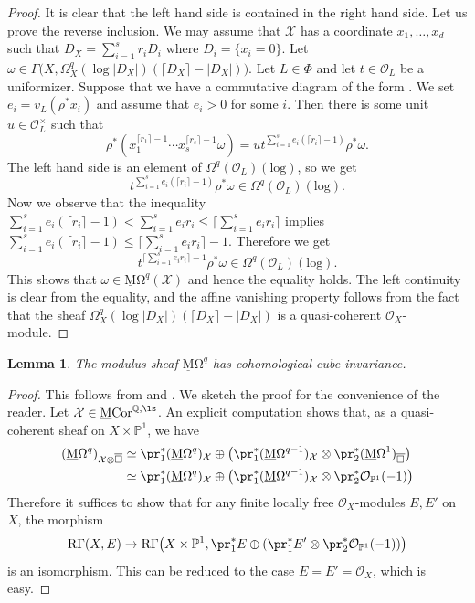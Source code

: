 \documentclass{amsart}
\theoremstyle{plain}
\newtheorem{lemma}[theorem]{Lemma}
\theoremstyle{definition}
\theoremstyle{remark}
\numberwithin{equation}{section}
\def\ceil#1{\lceil #1 \rceil}
\def\bcube{{\overline{\square}}}
\def\logrm{\mathrm{log}}
\def\RGamma{\mathrm{R}\Gamma}
\def\MCor{\mathrm{\underline{M}Cor}}
\def\MOmega{\mathrm{\underline{M}\Omega}}
\begin{document}
\begin{proof}
        It is clear that the left hand side is contained in the right hand side.
        Let us prove the reverse inclusion.
        We may assume that $\mathcal{X}$ has a coordinate $x_1,\dots,x_d$ such that $D_X=\sum_{i=1}^s r_i D_i$ where $D_i=\{x_i=0\}$.
        Let $\omega\in \Gamma\bigl(X,\Omega^q_X(\log |D_X|)(\ceil{D_X}-|D_X|)\bigr)$.
        Let $L\in \Phi$ and let $t\in \mathcal{O}_L$ be a uniformizer.
        Suppose that we have a commutative diagram of the form .
	We set $e_i=v_L(\rho^*x_i)$ and assume that $e_i>0$ for some $i$.
	Then there is some unit $u\in \mathcal{O}_L^\times$ such that
	$$
	\rho^*(x_1^{\ceil{r_1}-1}\cdots x_s^{\ceil{r_s}-1}\omega)
        = u t^{\sum_{i=1}^s e_i(\ceil{r_i}-1)}\rho^*\omega.
        $$
        The left hand side is an element of $\Omega^q(\mathcal{O}_L)(\logrm)$, so we get
        $$
            t^{\sum_{i=1}^s e_i(\ceil{r_i}-1)}\rho^*\omega \in \Omega^q(\mathcal{O}_L)(\logrm).
        $$
	Now we observe that the inequality $\sum_{i=1}^s e_i(\ceil{r_i}-1)<\sum_{i=1}^s e_i r_i\leq \ceil{\sum_{i=1}^s e_i r_i}$ implies $\sum_{i=1}^s e_i(\ceil{r_i}-1)\leq \ceil{\sum_{i=1}^s e_i r_i}-1$.
        Therefore we get
	$$
		t^{\ceil{\sum_{i=1}^s e_i r_i}-1}\rho^*\omega\in \Omega^q(\mathcal{O}_L)(\logrm).
	$$
	This shows that $\omega\in \MOmega^q(\mathcal{X})$ and hence the equality holds.
    The left continuity is clear from the equality, and the affine vanishing property follows from the fact that the sheaf $\Omega^q_X(\log |D_X|)(\ceil{D_X}-|D_X|)$ is a quasi-coherent $\mathcal{O}_X$-module.
\end{proof}

\begin{lemma}\label{omega_CCI}
	The modulus sheaf $\MOmega^q$ has cohomological cube invariance.
\end{lemma}

\begin{proof}
	This follows from  and \cite[Corollary 5.2]{KellyMiyazaki_Hodge2}.
	We sketch the proof for the convenience of the reader.
	Let $\mathcal{X}\in \MCor^{\mathbb{Q},\ls}$.
	An explicit computation shows that, as a quasi-coherent sheaf on $X\times\mathbb{P}^1$, we have
	\begin{align*}
		(\MOmega^q)_{\mathcal{X}\otimes\bcube}&{}\simeq \pr_1^*(\MOmega^q)_\mathcal{X}\oplus\bigl(\pr_1^*(\MOmega^{q-1})_\mathcal{X}\otimes\pr_2^*(\MOmega^1)_\bcube\bigr)\\
		&{}\simeq \pr_1^*(\MOmega^q)_\mathcal{X}\oplus\bigl(\pr_1^*(\MOmega^{q-1})_\mathcal{X}\otimes\pr_2^*\mathcal{O}_{\mathbb{P}^1}(-1)\bigr)
	\end{align*}
	Therefore it suffices to show that for any finite locally free $\mathcal{O}_X$-modules $E,E'$ on $X$, the morphism
        $$
            \RGamma (X,E) \to \RGamma\bigl(X\times\mathbb{P}^1, \pr_1^*E\oplus(\pr_1^*E'\otimes \pr_2^*\mathcal{O}_{\mathbb{P}^1}(-1))\bigr)
        $$
        is an isomorphism.
	This can be reduced to the case $E=E'=\mathcal{O}_X$, which is easy.
\end{proof}
\end{document}
